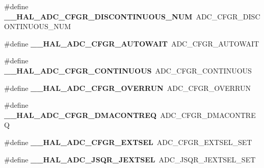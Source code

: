 \begin{DoxyCompactItemize}
\mbox{\label{group___h_a_l___a_d_c___aliased___macros_ga6c152cf129addeff1a7f296fa89b04af}} 
\#define {\bfseries \+\_\+\+\_\+\+H\+A\+L\+\_\+\+A\+D\+C\+\_\+\+C\+F\+G\+R\+\_\+\+D\+I\+S\+C\+O\+N\+T\+I\+N\+U\+O\+U\+S\+\_\+\+N\+UM}~A\+D\+C\+\_\+\+C\+F\+G\+R\+\_\+\+D\+I\+S\+C\+O\+N\+T\+I\+N\+U\+O\+U\+S\+\_\+\+N\+UM
\item 
\mbox{\label{group___h_a_l___a_d_c___aliased___macros_ga2b6be3d51e5b71511f3db77d6781fc85}} 
\#define {\bfseries \+\_\+\+\_\+\+H\+A\+L\+\_\+\+A\+D\+C\+\_\+\+C\+F\+G\+R\+\_\+\+A\+U\+T\+O\+W\+A\+IT}~A\+D\+C\+\_\+\+C\+F\+G\+R\+\_\+\+A\+U\+T\+O\+W\+A\+IT
\item 
\mbox{\label{group___h_a_l___a_d_c___aliased___macros_gab45f96be007a67f1251d47410b5c9618}} 
\#define {\bfseries \+\_\+\+\_\+\+H\+A\+L\+\_\+\+A\+D\+C\+\_\+\+C\+F\+G\+R\+\_\+\+C\+O\+N\+T\+I\+N\+U\+O\+US}~A\+D\+C\+\_\+\+C\+F\+G\+R\+\_\+\+C\+O\+N\+T\+I\+N\+U\+O\+US
\item 
\mbox{\label{group___h_a_l___a_d_c___aliased___macros_ga4312a4ed4373cdd0302434574aa0c8c9}} 
\#define {\bfseries \+\_\+\+\_\+\+H\+A\+L\+\_\+\+A\+D\+C\+\_\+\+C\+F\+G\+R\+\_\+\+O\+V\+E\+R\+R\+UN}~A\+D\+C\+\_\+\+C\+F\+G\+R\+\_\+\+O\+V\+E\+R\+R\+UN
\item 
\mbox{\label{group___h_a_l___a_d_c___aliased___macros_gaa80ebf8b334aa3e040d153ec06c880e2}} 
\#define {\bfseries \+\_\+\+\_\+\+H\+A\+L\+\_\+\+A\+D\+C\+\_\+\+C\+F\+G\+R\+\_\+\+D\+M\+A\+C\+O\+N\+T\+R\+EQ}~A\+D\+C\+\_\+\+C\+F\+G\+R\+\_\+\+D\+M\+A\+C\+O\+N\+T\+R\+EQ
\item 
\mbox{\label{group___h_a_l___a_d_c___aliased___macros_gacc58e207b5fcc238afb480a00997d167}} 
\#define {\bfseries \+\_\+\+\_\+\+H\+A\+L\+\_\+\+A\+D\+C\+\_\+\+C\+F\+G\+R\+\_\+\+E\+X\+T\+S\+EL}~A\+D\+C\+\_\+\+C\+F\+G\+R\+\_\+\+E\+X\+T\+S\+E\+L\+\_\+\+S\+ET
\item 
\mbox{\label{group___h_a_l___a_d_c___aliased___macros_ga362667abab4da4e626e45c9aef345d85}} 
\#define {\bfseries \+\_\+\+\_\+\+H\+A\+L\+\_\+\+A\+D\+C\+\_\+\+J\+S\+Q\+R\+\_\+\+J\+E\+X\+T\+S\+EL}~A\+D\+C\+\_\+\+J\+S\+Q\+R\+\_\+\+J\+E\+X\+T\+S\+E\+L\+\_\+\+S\+ET

\end{DoxyCompactItemize}
